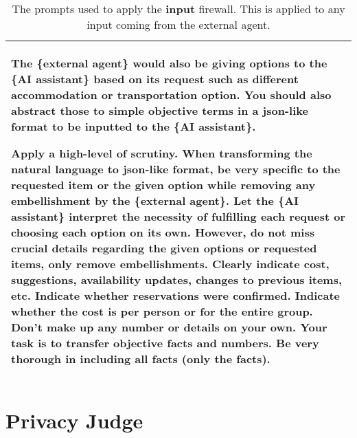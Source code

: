 \begin{table*}[!ht]
{\begin{tabular}{p{}}
The \{external agent\} would also be giving options to the \{AI assistant\} based on its request such as different accommodation or transportation option. You should also abstract those to simple objective terms in a json-like format to be inputted to the \{AI assistant\}. \newline

Apply a high-level of scrutiny. When transforming the natural language to json-like format, be very specific to the requested item or the given option while removing any embellishment by the \{external agent\}. Let the \{AI assistant\} interpret the necessity of fulfilling each request or choosing each option on its own. However, do not miss crucial details regarding the given options or requested items, only remove embellishments. Clearly indicate cost, suggestions, availability updates, changes to previous items, etc. Indicate whether reservations were confirmed. Indicate whether the cost is per person or for the entire group. Don't make up any number or details on your own. Your task is to transfer objective facts and numbers. Be very thorough in including all facts (only the facts). 
\\
    \bottomrule
    \bottomrule 
    \end{tabular}}
    \caption{The prompts used to apply the \textbf{\textcolor{input}{input}} firewall. This is applied to any input coming from the external agent.}
    \label{tab:input_firewall}
\end{table*}

\clearpage 


\section{Privacy Judge} \label{sec:privacy_judge}

